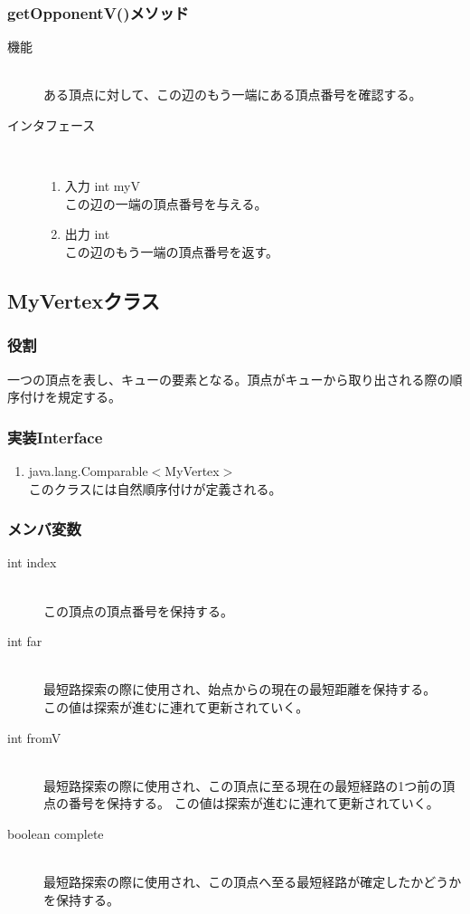 \documentclass[a4j]{jarticle}
\begin{document}
\begin{description}
\begin{description}
\subsubsection{getOpponentV()メソッド}

\begin{description}
\item[機能]\mbox{}\\
ある頂点に対して、この辺のもう一端にある頂点番号を確認する。

\item[インタフェース]\
  \begin{enumerate}
  \item 入力 int myV\mbox{}\\
    この辺の一端の頂点番号を与える。
  \item 出力 int\mbox{}\\
    この辺のもう一端の頂点番号を返す。
  \end{enumerate}
\end{description}

\subsection{MyVertexクラス}

\subsubsection{役割}
一つの頂点を表し、キューの要素となる。頂点がキューから取り出される際の順序付けを規定する。

\subsubsection{実装Interface}
\begin{enumerate}
\item java.lang.Comparable$<$MyVertex$>$\mbox{}\\
このクラスには自然順序付けが定義される。
\end{enumerate}

\subsubsection{メンバ変数}
\begin{description}
\item[int index]~\\
この頂点の頂点番号を保持する。
\item[int far]~\\
最短路探索の際に使用され、始点からの現在の最短距離を保持する。\\
この値は探索が進むに連れて更新されていく。
\item[int fromV]~\\
最短路探索の際に使用され、この頂点に至る現在の最短経路の1つ前の頂点の番号を保持する。
この値は探索が進むに連れて更新されていく。
\item[boolean complete]~\\
最短路探索の際に使用され、この頂点へ至る最短経路が確定したかどうかを保持する。
\end{description}


\end{description}
\end{description}
\end{document}
